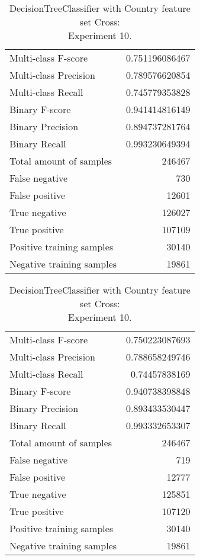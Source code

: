 \begin{table}[H]
\begin{minipage}{0.5\textwidth}
\caption{DecisionTreeClassifier with Country feature set Cross: \\Experiment 9.}
\centering
\begin{tabular}{l r}
\toprule
Multi-class F-score & 0.751196086467 \\
Multi-class Precision & 0.789576620854 \\
Multi-class Recall & 0.745779353828 \\
\midrule
Binary F-score & 0.941414816149 \\
Binary Precision & 0.894737281764 \\
Binary Recall & 0.993230649394 \\
\midrule
Total amount of samples & 246467 \\
False negative & 730 \\
False positive & 12601 \\
True negative & 126027 \\
True positive & 107109 \\
\midrule
Positive training samples & 30140 \\
Negative training samples & 19861 \\
\bottomrule
\end{tabular}

\end{minipage}
\hfillx
\begin{minipage}{0.5\textwidth}
\caption{DecisionTreeClassifier with Country feature set Cross: \\Experiment 10.}
\centering
\begin{tabular}{l r}
\toprule
Multi-class F-score & 0.750223087693 \\
Multi-class Precision & 0.788658249746 \\
Multi-class Recall & 0.74457838169 \\
\midrule
Binary F-score & 0.940738398848 \\
Binary Precision & 0.893433530447 \\
Binary Recall & 0.993332653307 \\
\midrule
Total amount of samples & 246467 \\
False negative & 719 \\
False positive & 12777 \\
True negative & 125851 \\
True positive & 107120 \\
\midrule
Positive training samples & 30140 \\
Negative training samples & 19861 \\
\bottomrule
\end{tabular}
\end{minipage}
\end{table}

